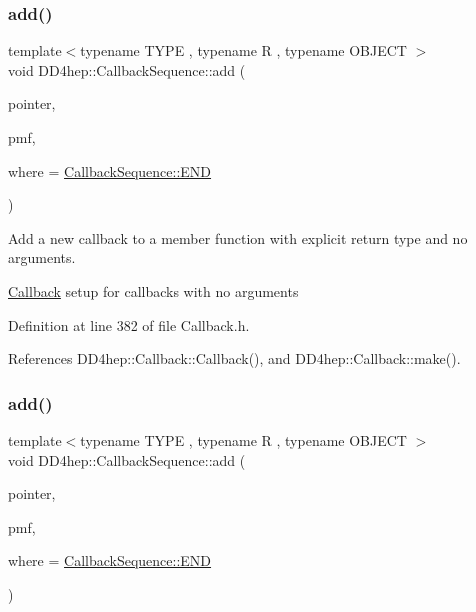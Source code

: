 \subsubsection{\texorpdfstring{add()}{add()}\hspace{0.1cm}{\footnotesize\ttfamily [2/13]}}
{\footnotesize\ttfamily template$<$typename T\+Y\+PE , typename R , typename O\+B\+J\+E\+CT $>$ \\
void D\+D4hep\+::\+Callback\+Sequence\+::add (\begin{DoxyParamCaption}\item[{T\+Y\+PE $\ast$}]{pointer,  }\item[{R(O\+B\+J\+E\+C\+T\+::$\ast$)()}]{pmf,  }\item[{\hyperlink{struct_d_d4hep_1_1_callback_sequence_a7753490247479633aed16a2376821ef7}{Location}}]{where = {\ttfamily \hyperlink{struct_d_d4hep_1_1_callback_sequence_a7753490247479633aed16a2376821ef7ac39eeb1bcfc1c235ab1d0d9315c310ac}{Callback\+Sequence\+::\+E\+ND}} }\end{DoxyParamCaption})\hspace{0.3cm}{\ttfamily [inline]}}



Add a new callback to a member function with explicit return type and no arguments. 

\hyperlink{class_d_d4hep_1_1_callback}{Callback} setup for callbacks with no arguments 

Definition at line 382 of file Callback.\+h.



References D\+D4hep\+::\+Callback\+::\+Callback(), and D\+D4hep\+::\+Callback\+::make().

\hypertarget{struct_d_d4hep_1_1_callback_sequence_ac3d546759574b29074d0153fa8d72175}{}\label{struct_d_d4hep_1_1_callback_sequence_ac3d546759574b29074d0153fa8d72175} 
\subsubsection{\texorpdfstring{add()}{add()}\hspace{0.1cm}{\footnotesize\ttfamily [3/13]}}
{\footnotesize\ttfamily template$<$typename T\+Y\+PE , typename R , typename O\+B\+J\+E\+CT $>$ \\
void D\+D4hep\+::\+Callback\+Sequence\+::add (\begin{DoxyParamCaption}\item[{T\+Y\+PE $\ast$}]{pointer,  }\item[{R(O\+B\+J\+E\+C\+T\+::$\ast$)() const}]{pmf,  }\item[{\hyperlink{struct_d_d4hep_1_1_callback_sequence_a7753490247479633aed16a2376821ef7}{Location}}]{where = {\ttfamily \hyperlink{struct_d_d4hep_1_1_callback_sequence_a7753490247479633aed16a2376821ef7ac39eeb1bcfc1c235ab1d0d9315c310ac}{Callback\+Sequence\+::\+E\+ND}} }\end{DoxyParamCaption})\hspace{0.3cm}{\ttfamily [inline]}}



